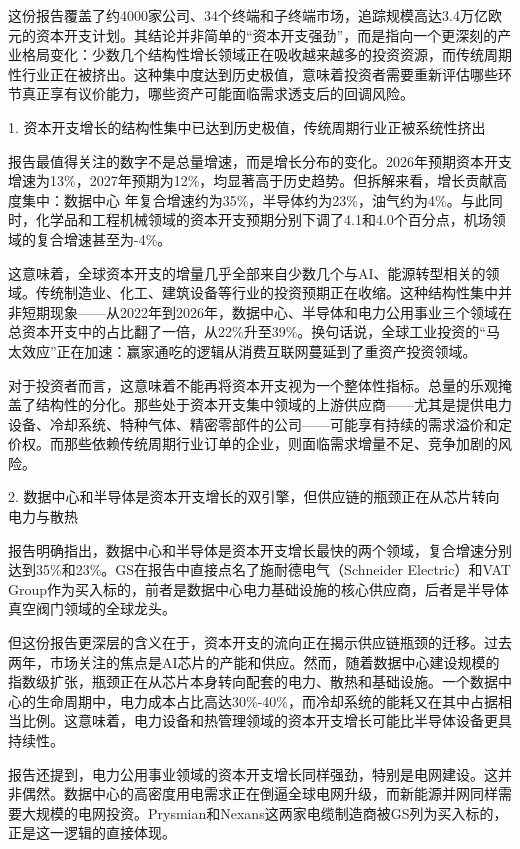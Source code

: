 \documentclass[11pt]{ctexart}
\begin{document}
这份报告覆盖了约4000家公司、34个终端和子终端市场，追踪规模高达3.4万亿欧元的资本开支计划。其结论并非简单的“资本开支强劲”，而是指向一个更深刻的产业格局变化：少数几个结构性增长领域正在吸收越来越多的投资资源，而传统周期性行业正在被挤出。这种集中度达到历史极值，意味着投资者需要重新评估哪些环节真正享有议价能力，哪些资产可能面临需求透支后的回调风险。

1. 资本开支增长的结构性集中已达到历史极值，传统周期行业正被系统性挤出

报告最值得关注的数字不是总量增速，而是增长分布的变化。2026年预期资本开支增速为13\%，2027年预期为12\%，均显著高于历史趋势。但拆解来看，增长贡献高度集中：数据中心 年复合增速约为35\%，半导体约为23\%，油气约为4\%。与此同时，化学品和工程机械领域的资本开支预期分别下调了4.1和4.0个百分点，机场领域的复合增速甚至为-4\%。

这意味着，全球资本开支的增量几乎全部来自少数几个与AI、能源转型相关的领域。传统制造业、化工、建筑设备等行业的投资预期正在收缩。这种结构性集中并非短期现象——从2022年到2026年，数据中心、半导体和电力公用事业三个领域在总资本开支中的占比翻了一倍，从22\%升至39\%。换句话说，全球工业投资的“马太效应”正在加速：赢家通吃的逻辑从消费互联网蔓延到了重资产投资领域。

对于投资者而言，这意味着不能再将资本开支视为一个整体性指标。总量的乐观掩盖了结构性的分化。那些处于资本开支集中领域的上游供应商——尤其是提供电力设备、冷却系统、特种气体、精密零部件的公司——可能享有持续的需求溢价和定价权。而那些依赖传统周期行业订单的企业，则面临需求增量不足、竞争加剧的风险。

2. 数据中心和半导体是资本开支增长的双引擎，但供应链的瓶颈正在从芯片转向电力与散热

报告明确指出，数据中心和半导体是资本开支增长最快的两个领域，复合增速分别达到35\%和23\%。GS在报告中直接点名了施耐德电气（Schneider Electric）和VAT Group作为买入标的，前者是数据中心电力基础设施的核心供应商，后者是半导体真空阀门领域的全球龙头。

但这份报告更深层的含义在于，资本开支的流向正在揭示供应链瓶颈的迁移。过去两年，市场关注的焦点是AI芯片的产能和供应。然而，随着数据中心建设规模的指数级扩张，瓶颈正在从芯片本身转向配套的电力、散热和基础设施。一个数据中心的生命周期中，电力成本占比高达30\%-40\%，而冷却系统的能耗又在其中占据相当比例。这意味着，电力设备和热管理领域的资本开支增长可能比半导体设备更具持续性。

报告还提到，电力公用事业领域的资本开支增长同样强劲，特别是电网建设。这并非偶然。数据中心的高密度用电需求正在倒逼全球电网升级，而新能源并网同样需要大规模的电网投资。Prysmian和Nexans这两家电缆制造商被GS列为买入标的，正是这一逻辑的直接体现。
\end{document}
